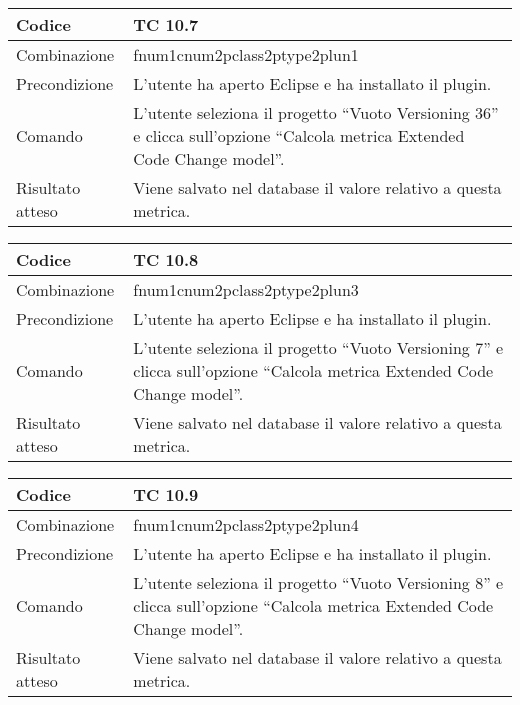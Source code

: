 \begin{table}[ht]
\begin{tabular}{|p{3cm}|p{9cm}|}
\hline
\cellcolor{lightgray}Codice				& TC 10.7								\\
\hline
\cellcolor{lightgray}Combinazione		& fnum1cnum2pclass2ptype2plun1									\\
\hline
\cellcolor{lightgray}Precondizione		& L'utente ha aperto Eclipse e ha installato il plugin.		\\
\hline
\cellcolor{lightgray}Comando			& L'utente seleziona il progetto ``Vuoto Versioning 36''  e clicca sull'opzione ``Calcola metrica Extended Code Change model''.	\\
\hline
\cellcolor{lightgray}Risultato atteso	& Viene salvato nel database il valore relativo a questa metrica.\\
\hline
\end{tabular}
\end{table}

\begin{table}[ht]
\begin{tabular}{|p{3cm}|p{9cm}|}
\hline
\cellcolor{lightgray}Codice				& TC 10.8								\\
\hline
\cellcolor{lightgray}Combinazione		& fnum1cnum2pclass2ptype2plun3									\\
\hline
\cellcolor{lightgray}Precondizione		& L'utente ha aperto Eclipse e ha installato il plugin.		\\
\hline
\cellcolor{lightgray}Comando			& L'utente seleziona il progetto ``Vuoto Versioning 7''  e clicca sull'opzione ``Calcola metrica Extended Code Change model''.	\\
\hline
\cellcolor{lightgray}Risultato atteso	& Viene salvato nel database il valore relativo a questa metrica.\\
\hline
\end{tabular}
\end{table}

\begin{table}[ht]
\begin{tabular}{|p{3cm}|p{9cm}|}
\hline
\cellcolor{lightgray}Codice				& TC 10.9								\\
\hline
\cellcolor{lightgray}Combinazione		& fnum1cnum2pclass2ptype2plun4									\\
\hline
\cellcolor{lightgray}Precondizione		& L'utente ha aperto Eclipse e ha installato il plugin.		\\
\hline
\cellcolor{lightgray}Comando			& L'utente seleziona il progetto ``Vuoto Versioning 8''  e clicca sull'opzione ``Calcola metrica Extended Code Change model''.	\\
\hline
\cellcolor{lightgray}Risultato atteso	& Viene salvato nel database il valore relativo a questa metrica.\\
\hline
\end{tabular}
\end{table}

